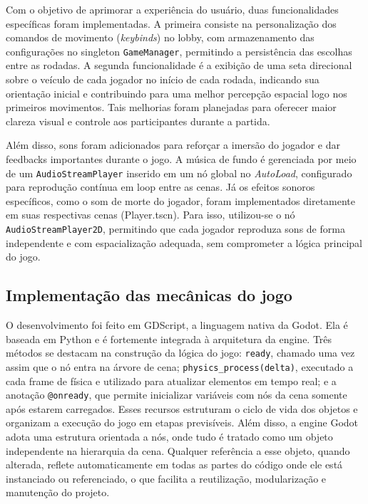 Com o objetivo de aprimorar a experiência do usuário, duas funcionalidades específicas foram implementadas. A primeira consiste na personalização dos comandos de movimento (\textit{keybinds}) no lobby, com armazenamento das configurações no singleton \texttt{GameManager}, permitindo a persistência das escolhas entre as rodadas. A segunda funcionalidade é a exibição de uma seta direcional sobre o veículo de cada jogador no início de cada rodada, indicando sua orientação inicial e contribuindo para uma melhor percepção espacial logo nos primeiros movimentos. Tais melhorias foram planejadas para oferecer maior clareza visual e controle aos participantes durante a partida.

Além disso, sons foram adicionados para reforçar a imersão do jogador e dar feedbacks importantes durante o jogo. A música de fundo é gerenciada por meio de um \texttt{AudioStreamPlayer} inserido em um nó global no \textit{AutoLoad}, configurado para reprodução contínua em loop entre as cenas. Já os efeitos sonoros específicos, como o som de morte do jogador, foram implementados diretamente em suas respectivas cenas (Player.tscn). Para isso, utilizou-se o nó \texttt{AudioStreamPlayer2D}, permitindo que cada jogador reproduza sons de forma independente e com espacialização adequada, sem comprometer a lógica principal do jogo.

\subsection{Implementação das mecânicas do jogo}

O desenvolvimento foi feito em GDScript, a linguagem nativa da Godot. Ela é baseada em Python e é fortemente integrada à arquitetura da engine. Três métodos se destacam na construção da lógica do jogo: \texttt{ready}, chamado uma vez assim que o nó entra na árvore de cena; \texttt{physics\_process(delta)}, executado a cada frame de física e utilizado para atualizar elementos em tempo real; e a anotação \texttt{@onready}, que permite inicializar variáveis com nós da cena somente após estarem carregados. Esses recursos estruturam o ciclo de vida dos objetos e organizam a execução do jogo em etapas previsíveis. Além disso, a engine Godot adota uma estrutura orientada a nós, onde tudo é tratado como um objeto independente na hierarquia da cena. Qualquer referência a esse objeto, quando alterada, reflete automaticamente em todas as partes do código onde ele está instanciado ou referenciado, o que facilita a reutilização, modularização e manutenção do projeto.

